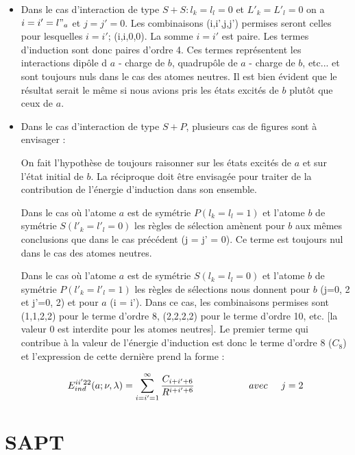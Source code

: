	\begin{itemize}
		\item Dans le cas d'interaction de type $S + S : l_{k} = l_{l} = 0$ et $ L'_{k} = L'_{l} = 0$ on a $i = i' = l"_{a}$ et $j= j' = 0$. Les combinaisons (i,i',j,j') permises seront celles pour lesquelles $i = i'$; (i,i,0,0). La somme $i = i'$ est paire. Les termes d'induction sont donc paires d'ordre 4. Ces termes représentent les interactions dipôle d $a$ - charge de $b$, quadrupôle de $a$ - charge de $b$, etc... et sont toujours nuls dans le cas des atomes neutres. Il est bien évident que le résultat serait le même si nous avions pris les états excités de $b$ plutôt que ceux de $a$. 
		
		\item Dans le cas d'interaction de type $S + P$, plusieurs cas de figures sont à envisager :
		
		On fait l'hypothèse de toujours raisonner sur les états excités de $a$ et sur l'état initial de $b$. La réciproque doit être envisagée pour traiter de la contribution de l'énergie d'induction dans son ensemble. 
		
		Dans le cas où l'atome $a$ est de symétrie $P (l_{k} = l_{l} = 1)$ et l'atome $b$ de symétrie $S (l'_{k} = l'_{l} = 0)$ les règles de sélection amènent pour $b$ aux mêmes conclusions que dans le cas précédent (j = j' = 0). Ce terme est toujours nul dans le cas des atomes neutres. 
		
		Dans le cas où l'atome $a$ est de symétrie $S (l_{k} = l_{l} = 0)$ et l'atome $b$ de symétrie $P (l'_{k} = l'_{l} = 1)$ les règles de sélections nous donnent pour $b$ (j=0, 2 et j'=0, 2) et pour $a$ (i = i'). Dans ce cas, les combinaisons permises sont (1,1,2,2) pour le terme d'ordre 8, (2,2,2,2) pour le terme d'ordre 10, etc. [la valeur 0 est interdite pour les atomes neutres]. Le premier terme qui contribue à la valeur de l'énergie d'induction est donc le terme d'ordre 8 ($C_{8}$) et l'expression de cette dernière prend la forme : 
		
		\begin{equation}
		E_{ind}^{ii'22} (a;\nu , \lambda) = \sum_{i=i'=1}^{\infty} \frac{C_{i+i'+6}}{R^{i+i'+6}} \hspace{2cm} avec \hspace{0.5cm} j = 2
		\end{equation}
		
	\end{itemize}
	
	
	
   \section{SAPT}
   
